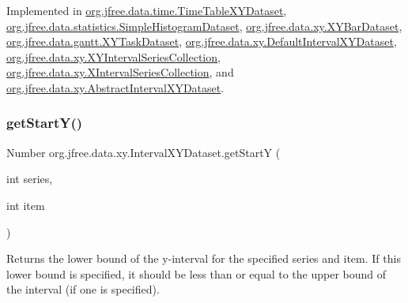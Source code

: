 Implemented in \mbox{\hyperlink{classorg_1_1jfree_1_1data_1_1time_1_1_time_table_x_y_dataset_a0173db781cf6ea359c9937b4bbac4dd1}{org.\+jfree.\+data.\+time.\+Time\+Table\+X\+Y\+Dataset}}, \mbox{\hyperlink{classorg_1_1jfree_1_1data_1_1statistics_1_1_simple_histogram_dataset_a46053237a9d5ab27ed36a7ed0b83e537}{org.\+jfree.\+data.\+statistics.\+Simple\+Histogram\+Dataset}}, \mbox{\hyperlink{classorg_1_1jfree_1_1data_1_1xy_1_1_x_y_bar_dataset_aa9cfc4276ea7952e5907d0584ff541c4}{org.\+jfree.\+data.\+xy.\+X\+Y\+Bar\+Dataset}}, \mbox{\hyperlink{classorg_1_1jfree_1_1data_1_1gantt_1_1_x_y_task_dataset_a142d508701d22e9653c03b99ab29be4a}{org.\+jfree.\+data.\+gantt.\+X\+Y\+Task\+Dataset}}, \mbox{\hyperlink{classorg_1_1jfree_1_1data_1_1xy_1_1_default_interval_x_y_dataset_abe34d984a43f87ac2880c8878c71587d}{org.\+jfree.\+data.\+xy.\+Default\+Interval\+X\+Y\+Dataset}}, \mbox{\hyperlink{classorg_1_1jfree_1_1data_1_1xy_1_1_x_y_interval_series_collection_a10718ae7eb5370e473b0c9f1c0e23d58}{org.\+jfree.\+data.\+xy.\+X\+Y\+Interval\+Series\+Collection}}, \mbox{\hyperlink{classorg_1_1jfree_1_1data_1_1xy_1_1_x_interval_series_collection_ae637f5eee2dc6bcf67b5c782444db397}{org.\+jfree.\+data.\+xy.\+X\+Interval\+Series\+Collection}}, and \mbox{\hyperlink{classorg_1_1jfree_1_1data_1_1xy_1_1_abstract_interval_x_y_dataset_a17554a8ef17203f1c12cbeaed806d092}{org.\+jfree.\+data.\+xy.\+Abstract\+Interval\+X\+Y\+Dataset}}.

\mbox{\label{interfaceorg_1_1jfree_1_1data_1_1xy_1_1_interval_x_y_dataset_afdd414735adb233734bc35b76a005ed9}} 
\subsubsection{\texorpdfstring{get\+Start\+Y()}{getStartY()}}
{\footnotesize\ttfamily Number org.\+jfree.\+data.\+xy.\+Interval\+X\+Y\+Dataset.\+get\+StartY (\begin{DoxyParamCaption}\item[{int}]{series,  }\item[{int}]{item }\end{DoxyParamCaption})}

Returns the lower bound of the y-\/interval for the specified series and item. If this lower bound is specified, it should be less than or equal to the upper bound of the interval (if one is specified).


